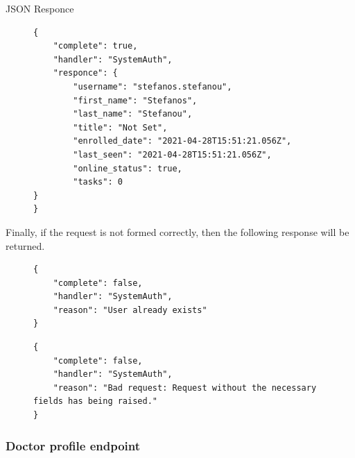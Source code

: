 					JSON Responce
					\begin{figure}[H]
						\iftrue
						\begin{lstlisting}[]
{
	"complete": true,
	"handler": "SystemAuth",
	"responce": {
		"username": "stefanos.stefanou",
		"first_name": "Stefanos",
		"last_name": "Stefanou",
		"title": "Not Set",
		"enrolled_date": "2021-04-28T15:51:21.056Z",
		"last_seen": "2021-04-28T15:51:21.056Z",
		"online_status": true,
		"tasks": 0
}
}
						\end{lstlisting}
					\end{figure}
					Finally, if the request is not formed correctly, then the following response will be returned.
					\begin{figure}[H]
						\iftrue
						\begin{lstlisting}[]
{
	"complete": false,
	"handler": "SystemAuth",
	"reason": "User already exists"
}
						\end{lstlisting}
					\end{figure}
					
					\begin{figure}[H]
						\iftrue
						\begin{lstlisting}[]
{
	"complete": false,
	"handler": "SystemAuth",
	"reason": "Bad request: Request without the necessary fields has being raised."
}
						\end{lstlisting}
					\end{figure}
				\subsubsection{Doctor profile endpoint}
				
